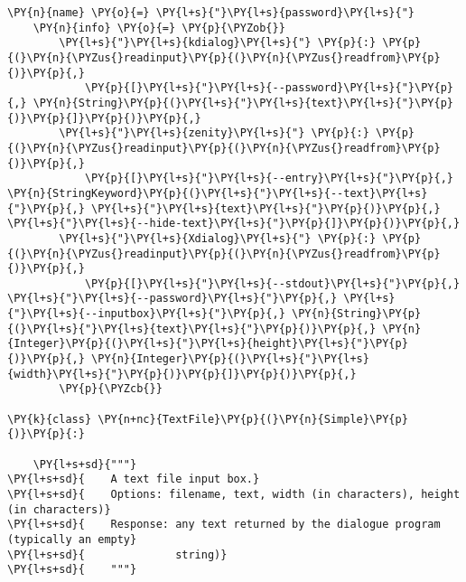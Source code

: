 \begin{Verbatim}[commandchars=\\\{\}]
    \PY{n}{name} \PY{o}{=} \PY{l+s}{"}\PY{l+s}{password}\PY{l+s}{"}
    \PY{n}{info} \PY{o}{=} \PY{p}{\PYZob{}}
        \PY{l+s}{"}\PY{l+s}{kdialog}\PY{l+s}{"} \PY{p}{:} \PY{p}{(}\PY{n}{\PYZus{}readinput}\PY{p}{(}\PY{n}{\PYZus{}readfrom}\PY{p}{)}\PY{p}{,}
            \PY{p}{[}\PY{l+s}{"}\PY{l+s}{--password}\PY{l+s}{"}\PY{p}{,} \PY{n}{String}\PY{p}{(}\PY{l+s}{"}\PY{l+s}{text}\PY{l+s}{"}\PY{p}{)}\PY{p}{]}\PY{p}{)}\PY{p}{,}
        \PY{l+s}{"}\PY{l+s}{zenity}\PY{l+s}{"} \PY{p}{:} \PY{p}{(}\PY{n}{\PYZus{}readinput}\PY{p}{(}\PY{n}{\PYZus{}readfrom}\PY{p}{)}\PY{p}{,}
            \PY{p}{[}\PY{l+s}{"}\PY{l+s}{--entry}\PY{l+s}{"}\PY{p}{,} \PY{n}{StringKeyword}\PY{p}{(}\PY{l+s}{"}\PY{l+s}{--text}\PY{l+s}{"}\PY{p}{,} \PY{l+s}{"}\PY{l+s}{text}\PY{l+s}{"}\PY{p}{)}\PY{p}{,} \PY{l+s}{"}\PY{l+s}{--hide-text}\PY{l+s}{"}\PY{p}{]}\PY{p}{)}\PY{p}{,}
        \PY{l+s}{"}\PY{l+s}{Xdialog}\PY{l+s}{"} \PY{p}{:} \PY{p}{(}\PY{n}{\PYZus{}readinput}\PY{p}{(}\PY{n}{\PYZus{}readfrom}\PY{p}{)}\PY{p}{,}
            \PY{p}{[}\PY{l+s}{"}\PY{l+s}{--stdout}\PY{l+s}{"}\PY{p}{,} \PY{l+s}{"}\PY{l+s}{--password}\PY{l+s}{"}\PY{p}{,} \PY{l+s}{"}\PY{l+s}{--inputbox}\PY{l+s}{"}\PY{p}{,} \PY{n}{String}\PY{p}{(}\PY{l+s}{"}\PY{l+s}{text}\PY{l+s}{"}\PY{p}{)}\PY{p}{,} \PY{n}{Integer}\PY{p}{(}\PY{l+s}{"}\PY{l+s}{height}\PY{l+s}{"}\PY{p}{)}\PY{p}{,} \PY{n}{Integer}\PY{p}{(}\PY{l+s}{"}\PY{l+s}{width}\PY{l+s}{"}\PY{p}{)}\PY{p}{]}\PY{p}{)}\PY{p}{,}
        \PY{p}{\PYZcb{}}

\PY{k}{class} \PY{n+nc}{TextFile}\PY{p}{(}\PY{n}{Simple}\PY{p}{)}\PY{p}{:}

    \PY{l+s+sd}{"""}
\PY{l+s+sd}{    A text file input box.}
\PY{l+s+sd}{    Options: filename, text, width (in characters), height (in characters)}
\PY{l+s+sd}{    Response: any text returned by the dialogue program (typically an empty}
\PY{l+s+sd}{              string)}
\PY{l+s+sd}{    """}


\end{Verbatim}
